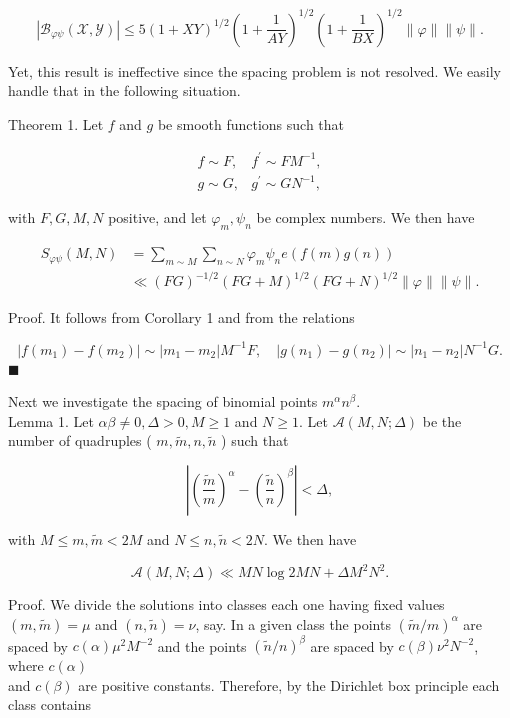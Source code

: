 \documentclass[10pt]{article}
\newcommand{\proofend}{\hfill\(\blacksquare\)}
\begin{document}
$$
\left|\mathscr{B}_{\varphi \psi}(\mathscr{X}, \mathscr{Y})\right| \leqslant 5(1+X Y)^{1 / 2}\left(1+\frac{1}{A Y}\right)^{1 / 2}\left(1+\frac{1}{B X}\right)^{1 / 2}\|\varphi\|\|\psi\| .
$$

Yet, this result is ineffective since the spacing problem is not resolved. We easily handle that in the following situation.

Theorem 1. Let $f$ and $g$ be smooth functions such that

$$
\begin{array}{ll}
f \sim F, & f^{\prime} \sim F M^{-1}, \\
g \sim G, & g^{\prime} \sim G N^{-1},
\end{array}
$$

with $F, G, M, N$ positive, and let $\varphi_{m}, \psi_{n}$ be complex numbers. We then have

$$
\begin{aligned}
S_{\varphi\psi}(M, N) & =\sum_{m \sim M} \sum_{n \sim N} \varphi_{m} \psi_{n} e(f(m) g(n)) \\
& \ll(F G)^{-1 / 2}(F G+M)^{1 / 2}(F G+N)^{1 / 2}\|\varphi\|\|\psi\| .
\end{aligned}
$$

Proof. It follows from Corollary 1 and from the relations

$$
\left|f\left(m_{1}\right)-f\left(m_{2}\right)\right| \sim\left|m_{1}-m_{2}\right| M^{-1} F, \quad\left|g\left(n_{1}\right)-g\left(n_{2}\right)\right| \sim\left|n_{1}-n_{2}\right| N^{-1} G .
$$
\proofend

Next we investigate the spacing of binomial points $m^{\alpha} n^{\beta}$.\\
Lemma 1. Let $\alpha \beta \neq 0, \Delta>0, M \geqslant 1$ and $N \geqslant 1$. Let $\mathscr{A}(M, N ; \Delta)$ be the number of quadruples ( $m, \tilde{m}, n, \tilde{n}$ ) such that

$$
\left|\left(\frac{\tilde{m}}{m}\right)^{\alpha}-\left(\frac{\tilde{n}}{n}\right)^{\beta}\right|<\Delta,
$$

with $M \leqslant m, \tilde{m}<2 M$ and $N \leqslant n, \tilde{n}<2 N$. We then have

$$
\mathscr{A}(M, N ; \Delta) \ll M N \log 2 M N+\Delta M^{2} N^{2} .
$$

Proof. We divide the solutions into classes each one having fixed values $(m, \tilde{m})=\mu$ and $(n, \tilde{n})=\nu$, say. In a given class the points $(\tilde{m} / m)^{\alpha}$ are spaced by $c(\alpha) \mu^{2} M^{-2}$ and the points $(\tilde{n} / n)^{\beta}$ are spaced by $c(\beta)\nu^{2}N^{-2}$, where $c(\alpha)$\\
and $c(\beta)$ are positive constants. Therefore, by the Dirichlet box principle each class contains
\end{document}
